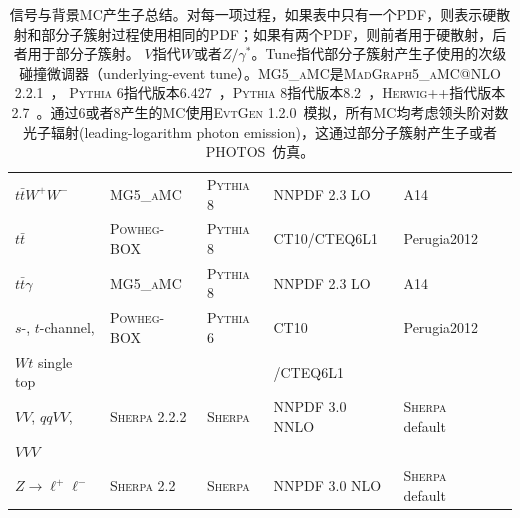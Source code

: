 \begin{table}[h]
\begin{center}
{{\begin{tabular}{llllll}
$t\bar t W^+ W^-$ & \textsc{MG5\_aMC} & \textsc{Pythia} 8 & NNPDF 2.3 LO & A14  \\
$t\bar{t}$ & \textsc{Powheg-BOX} \cite{powhegtt} & \textsc{Pythia} 8 & CT10/CTEQ6L1 & Perugia2012  \\
$t\bar{t}\gamma$ & \textsc{MG5\_aMC} & \textsc{Pythia} 8 & NNPDF 2.3 LO & A14  \\
$s$-, $t$-channel, & \textsc{Powheg-BOX} \cite{powhegstp,powhegstp2} & \textsc{Pythia} 6 & CT10 & Perugia2012   \\
 $Wt$ single top & & & /CTEQ6L1 \\
$VV$, $qqVV$, & \textsc{Sherpa} 2.2.2 \cite{sherpa} & \textsc{Sherpa} & NNPDF 3.0 NNLO & \textsc{Sherpa} default  \\
$VVV$ & & & \\
$Z \to \ell^+\ell^-$ & \textsc{Sherpa} 2.2 & \textsc{Sherpa} & NNPDF 3.0 NLO & \textsc{Sherpa} default \\
\hline\hline
\end{tabular}}
}
\caption{\label{tab:mcconfig} 
信号与背景MC产生子总结。对每一项过程，如果表中只有一个PDF，则表示硬散射和部分子簇射过程使用相同的PDF；如果有两个PDF，则前者用于硬散射，后者用于部分子簇射。
$V$指代$W$或者$Z/\gamma^*$。Tune指代部分子簇射产生子使用的次级碰撞微调器（underlying-event tune）。\textsc{MG5\_aMC}是\textsc{MadGraph5\_aMC@NLO} 2.2.1~\cite{Alwall:2014hca}，
\textsc{Pythia} 6指代版本6.427~\cite{pythia6}，\textsc{Pythia} 8指代版本8.2~\cite{pythia8}，\textsc{Herwig++}指代版本2.7~\cite{Bahr:2008pv}。通过\PYTHIA 6或者\PYTHIA 8产生的MC使用\textsc{EvtGen} 1.2.0~\cite{Lange:2001uf}模拟，所有MC均考虑领头阶对数光子辐射(leading-logarithm photon emission)，这通过部分子簇射产生子或者\textsc{PHOTOS}~\cite{Golonka:2005pn}仿真。
}
\end{center}
\end{table}


